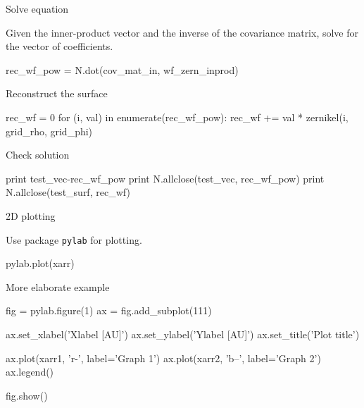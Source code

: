 \documentclass[xetex,10pt]{beamer}
\def\pythoni{\lstinline[language=pythontim]}
\def\spacer{\vspace*{1em}}
\begin{document}
\begin{frame}[fragile]{Solve equation}

Given the inner-product vector and the inverse of the covariance matrix, solve for the vector of coefficients.

\begin{python}
rec_wf_pow = N.dot(cov_mat_in, wf_zern_inprod)
\end{python}

\spacer
\pause
Reconstruct the surface
\begin{python}
rec_wf = 0
for (i, val) in enumerate(rec_wf_pow):
  rec_wf += val * zernikel(i, grid_rho, grid_phi)
\end{python}

\spacer
\pause
Check solution
\begin{python}
print test_vec-rec_wf_pow
print N.allclose(test_vec, rec_wf_pow)
print N.allclose(test_surf, rec_wf)
\end{python}

\end{frame}

\begin{frame}[fragile]{2D plotting}

Use package \pythoni{pylab} for plotting.

\begin{python}
pylab.plot(xarr)
\end{python}

\spacer
\pause
More elaborate example

\begin{python}
fig = pylab.figure(1)
ax = fig.add_subplot(111)

ax.set_xlabel('Xlabel [AU]')
ax.set_ylabel('Ylabel [AU]')
ax.set_title('Plot title')

ax.plot(xarr1, 'r-', label='Graph 1')
ax.plot(xarr2, 'b--', label='Graph 2')
ax.legend()

fig.show()
\end{python}

\end{frame}
\end{document}
